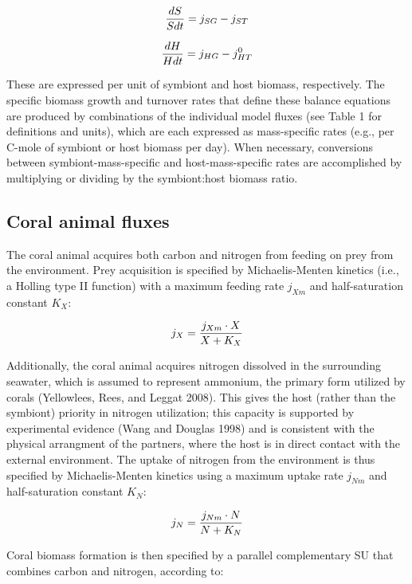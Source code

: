 \documentclass[]{elsarticle} %
\begin{document}
\begin{equation} {dS \over Sdt} = j_{SG} - j_{ST} \end{equation}

\begin{equation} {dH \over Hdt} = j_{HG} - j_{HT}^0 \end{equation}

These are expressed per unit of symbiont and host biomass, respectively.
The specific biomass growth and turnover rates that define these balance
equations are produced by combinations of the individual model fluxes
(see Table 1 for definitions and units), which are each expressed as
mass-specific rates (e.g., per C-mole of symbiont or host biomass per
day). When necessary, conversions between symbiont-mass-specific and
host-mass-specific rates are accomplished by multiplying or dividing by
the symbiont:host biomass ratio.

\subsection{Coral animal fluxes}\label{coral-animal-fluxes}

The coral animal acquires both carbon and nitrogen from feeding on prey
from the environment. Prey acquisition is specified by Michaelis-Menten
kinetics (i.e., a Holling type II function) with a maximum feeding rate
\(j_{Xm}\) and half-saturation constant \(K_X\):

\begin{equation} j_X = {{j_{Xm} \cdot X} \over {X + K_X}} \end{equation}

Additionally, the coral animal acquires nitrogen dissolved in the
surrounding seawater, which is assumed to represent ammonium, the
primary form utilized by corals (Yellowlees, Rees, and Leggat 2008).
This gives the host (rather than the symbiont) priority in nitrogen
utilization; this capacity is supported by experimental evidence (Wang
and Douglas 1998) and is consistent with the physical arrangment of the
partners, where the host is in direct contact with the external
environment. The uptake of nitrogen from the environment is thus
specified by Michaelis-Menten kinetics using a maximum uptake rate
\(j_{Nm}\) and half-saturation constant \(K_N\):

\begin{equation} j_N = {{j_{Nm} \cdot N} \over {N + K_N}} \end{equation}

Coral biomass formation is then specified by a parallel complementary SU
that combines carbon and nitrogen, according to:
\end{document}
